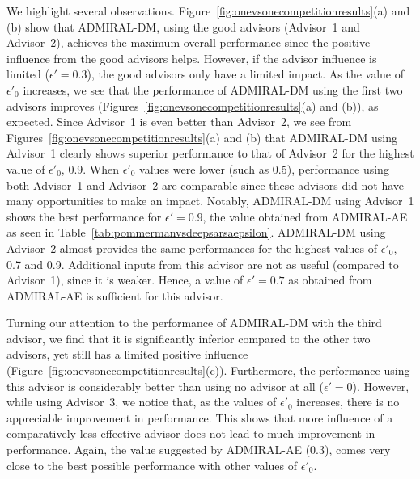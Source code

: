 \documentclass[jair, twoside,11pt,theapa]{article}
\begin{document}
We highlight several observations. Figure~\ref{fig:onevsonecompetitionresults}(a) and (b) show that ADMIRAL-DM, using the good advisors (Advisor~1 and Advisor~2), achieves the maximum overall performance since the positive influence from the good advisors helps. However, if the advisor influence is limited ($\epsilon'=0.3$), the good advisors  only have a limited impact. As the value of $\epsilon'_0$ increases, we see that the performance of ADMIRAL-DM using the first two advisors improves (Figures~\ref{fig:onevsonecompetitionresults}(a) and (b)), as expected. Since Advisor~1 is even better than Advisor~2, we see from Figures~\ref{fig:onevsonecompetitionresults}(a) and (b) that ADMIRAL-DM using Advisor~1 clearly shows superior performance to that of Advisor~2 for the highest value of $\epsilon'_0$, 0.9. When $\epsilon'_0$ values were lower (such as 0.5), performance using both Advisor~1 and Advisor~2 are comparable since these advisors did not have many opportunities to make an impact. Notably, ADMIRAL-DM using Advisor~1 shows the best performance for $\epsilon'=0.9$, the value obtained from ADMIRAL-AE as seen in Table~\ref{tab:pommermanvsdeepsarsaepsilon}. ADMIRAL-DM using Advisor~2 almost provides the same performances for the highest values of $\epsilon'_0$, 0.7 and 0.9. Additional inputs from this advisor are not as useful (compared to Advisor~1), since it is weaker. Hence, a value of $\epsilon'=0.7$ as obtained from ADMIRAL-AE is sufficient for this advisor. 



Turning our attention to the performance of ADMIRAL-DM with the third advisor, we find that it is significantly inferior compared to the other two advisors, yet still has a limited positive influence (Figure~\ref{fig:onevsonecompetitionresults}(c)). Furthermore,  the performance using this advisor is considerably better than using no advisor at all ($\epsilon'=0$). However, while using Advisor~3, we notice that, as the values of $\epsilon'_0$ increases, there is no appreciable improvement in performance. This shows that more influence of a comparatively less effective advisor does not lead to much improvement in performance. Again, the value suggested by ADMIRAL-AE (0.3), comes very close to the best possible performance with other values of $\epsilon'_0$. 
\end{document}
